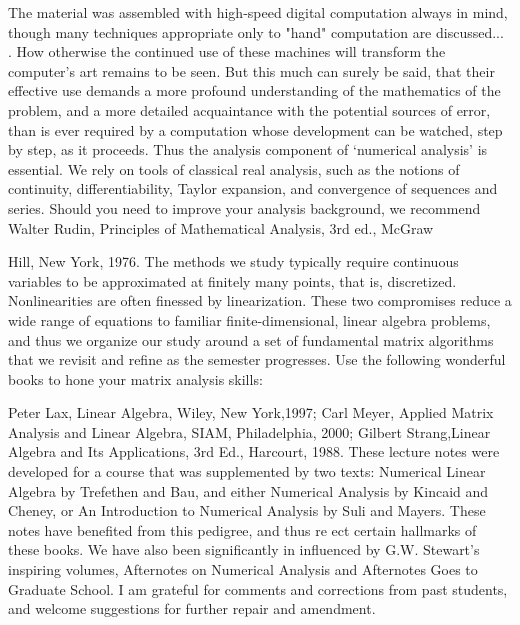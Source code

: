 The material was assembled with high-speed digital computation always in mind, though many techniques appropriate only to "hand" computation are discussed... . How otherwise the continued use of these machines will transform the computer's art remains to be seen. But this much can surely be said, that their effective use demands a more profound understanding of the mathematics of the problem, and a more detailed acquaintance with the potential sources of error, than is ever required by a computation whose development can be watched, step by step, as it proceeds. Thus the analysis component of `numerical analysis' is essential. We rely on tools of classical real analysis, such as the notions of continuity, differentiability, Taylor expansion, and convergence of sequences and series. Should you need to improve your analysis background, we recommend  Walter Rudin, Principles of Mathematical Analysis, 3rd ed., McGraw{Hill, New York, 1976. The methods we study typically require continuous variables to be approximated at finitely many points, that is, discretized. Nonlinearities are often finessed by linearization. These two compromises reduce a wide range of equations to familiar finite-dimensional, linear algebra problems, and thus we organize our study around a set of fundamental matrix algorithms that we revisit and refine as the semester progresses. Use the following wonderful books to hone your matrix analysis skills:

Peter Lax, Linear Algebra, Wiley, New York,1997; Carl Meyer, Applied Matrix Analysis and Linear Algebra, SIAM, Philadelphia, 2000; Gilbert Strang,Linear Algebra and Its Applications, 3rd Ed., Harcourt, 1988. These lecture notes were developed for a course that was supplemented by two texts: Numerical Linear Algebra by Trefethen and Bau, and either Numerical Analysis by Kincaid and Cheney, or An Introduction to Numerical Analysis by Suli and Mayers. These notes have benefited from this pedigree, and thus re ect certain hallmarks of these books. We have also been significantly in influenced by G.W. Stewart's inspiring volumes, Afternotes on Numerical Analysis and Afternotes Goes to Graduate School. I am grateful for comments and
corrections from past students, and welcome suggestions for further repair and amendment.

\medskip
{}
\chead{}
}
